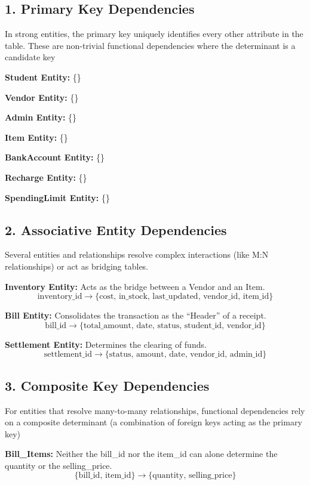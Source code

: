 \documentclass[a4paper,12pt]{article}
\begin{document}
\subsection*{1. Primary Key Dependencies}
In strong entities, the primary key uniquely identifies every other attribute in the table. These are non-trivial functional dependencies where the determinant is a candidate key
\newline
\item \textbf{Student Entity:}   \rightarrow \{\} 
\item \textbf{Vendor Entity:}   \rightarrow \{\} 
\item \textbf{Admin Entity:}  \rightarrow \{\} 
\item \textbf{Item Entity:}  \rightarrow \{\} 
\item \textbf{BankAccount Entity:}  \rightarrow \{\} 
\item \textbf{Recharge Entity:}  \rightarrow \{\} 
\item \textbf{SpendingLimit Entity:}  \rightarrow \{\} 

\subsection*{2. Associative Entity Dependencies}
Several entities and relationships resolve complex interactions (like M:N relationships) or act as bridging tables.
\newline
\item \textbf{Inventory Entity:} Acts as the bridge between a Vendor and an Item.
\[ \text{inventory\_id} \rightarrow \{\text{cost, in\_stock, last\_updated, vendor\_id, item\_id}\} \]
\item \textbf{Bill Entity:} Consolidates the transaction as the ``Header'' of a receipt.
\[ \text{bill\_id} \rightarrow \{\text{total\_amount, date, status, student\_id, vendor\_id}\} \]
\item \textbf{Settlement Entity:} Determines the clearing of funds.
\[ \text{settlement\_id} \rightarrow \{\text{status, amount, date, vendor\_id, admin\_id}\} \]

\subsection*{3. Composite Key Dependencies}
For entities that resolve many-to-many relationships, functional dependencies rely on a \newline  composite determinant (a combination of foreign keys acting as the primary key)
\newline
\item \textbf{Bill\_Items:} Neither the bill\_id nor the item\_id can alone determine the quantity or the \newline selling\_price.
    \[ \{\text{bill\_id, item\_id}\} \rightarrow \{\text{quantity, selling\_price}\} \]
    
\end{document}

